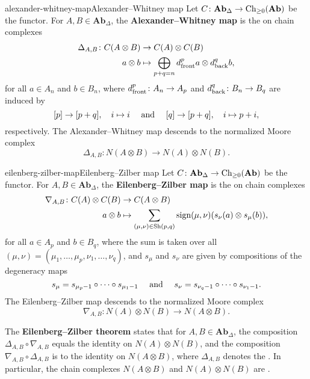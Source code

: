 \begin{topic}{alexander-whitney-map}{Alexander--Whitney map}
    Let $C \colon \textbf{Ab}_\Delta \to \textup{Ch}_{\ge 0}(\textbf{Ab})$ be the  functor. For $A, B \in \textbf{Ab}_\Delta$, the \textbf{Alexander--Whitney map} is the  on chain complexes
    \[ \begin{aligned}
        \Delta_{A, B} \colon C(A \otimes B) &\to C(A) \otimes C(B) \\
        a \otimes b &\mapsto \bigoplus_{p + q = n} d_\textup{front}^p a \otimes d_\textup{back}^q b ,
    \end{aligned} \]
    for all $a \in A_n$ and $b \in B_n$, where $d_\textup{front}^p \colon A_n \to A_p$ and $d_\textup{back}^q \colon B_n \to B_q$ are induced by
    \[ [p] \to [p + q], \quad i \mapsto i \quad \textup{ and } \quad [q] \to [p + q], \quad i \mapsto p + i , \]
    respectively. The Alexander--Whitney map descends to the normalized Moore complex
    \[ \Delta_{A, B} \colon N(A \otimes B) \to N(A) \otimes N(B) . \]
\end{topic}

\begin{topic}{eilenberg-zilber-map}{Eilenberg--Zilber map}
    Let $C \colon \textbf{Ab}_\Delta \to \textup{Ch}_{\ge 0}(\textbf{Ab})$ be the  functor. For $A, B \in \textbf{Ab}_\Delta$, the \textbf{Eilenberg--Zilber map} is the  on chain complexes
    \[ \begin{aligned}
        \nabla_{A, B} \colon C(A) \otimes C(B) &\to C(A \otimes B) \\
        a \otimes b &\mapsto \sum_{(\mu, \nu) \in \textup{Sh}(p, q)} \textup{sign}(\mu, \nu) (s_\nu(a) \otimes s_\mu(b)) ,
    \end{aligned} \]
    for all $a \in A_p$ and $b \in B_q$, where the sum is taken over all  $(\mu, \nu) = (\mu_1, \ldots, \mu_p, \nu_1, \ldots, \nu_q)$, and $s_\mu$ and $s_\nu$ are given by compositions of the degeneracy maps
    \[ s_\mu = s_{\mu_p - 1} \circ \cdots \circ s_{\mu_1 - 1} \quad \textup{ and } \quad s_\nu = s_{\nu_q - 1} \circ \cdots \circ s_{\nu_1 - 1} . \]
    The Eilenberg--Zilber map descends to the normalized Moore complex
    \[ \nabla_{A, B} \colon N(A) \otimes N(B) \to N(A \otimes B) . \]
    
    The \textbf{Eilenberg--Zilber theorem} states that for $A, B \in \textbf{Ab}_\Delta$, the composition $\Delta_{A, B} \circ \nabla_{A, B}$ equals the identity on $N(A) \otimes N(B)$, and the composition $\nabla_{A, B} \circ \Delta_{A, B}$ is  to the identity on $N(A \otimes B)$, where $\Delta_{A, B}$ denotes the . In particular, the chain complexes $N(A \otimes B)$ and $N(A) \otimes N(B)$ are .
\end{topic}
